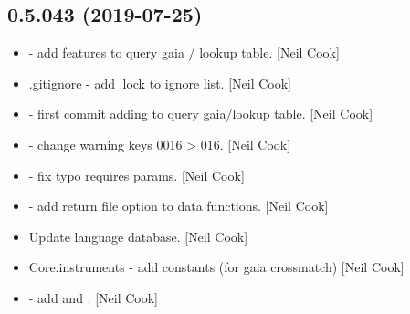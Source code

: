 \documentclass[a4paper,10pt,english]{report}
\begin{document}
\subsection{0.5.043 (2019-07-25)}
\label{\detokenize{misc/changelog:id99}}\begin{itemize}
\item {} 
 - add features to query gaia / lookup table.
{[}Neil Cook{]}

\item {} 
.gitignore - add .lock to ignore list. {[}Neil Cook{]}

\item {} 
 - first commit \textendash{} adding to query
gaia/lookup table. {[}Neil Cook{]}

\item {} 
 - change warning keys 0016 \textendash{}\textgreater{} 016.
{[}Neil Cook{]}

\item {} 
 - fix typo  requires params. {[}Neil
Cook{]}

\item {} 
 - add return file option to data functions. {[}Neil Cook{]}

\item {} 
Update language database. {[}Neil Cook{]}

\item {} 
Core.instruments - add  constants (for gaia crossmatch) {[}Neil
Cook{]}

\item {} 
 - add  and . {[}Neil Cook{]}

\end{itemize}
\end{document}
